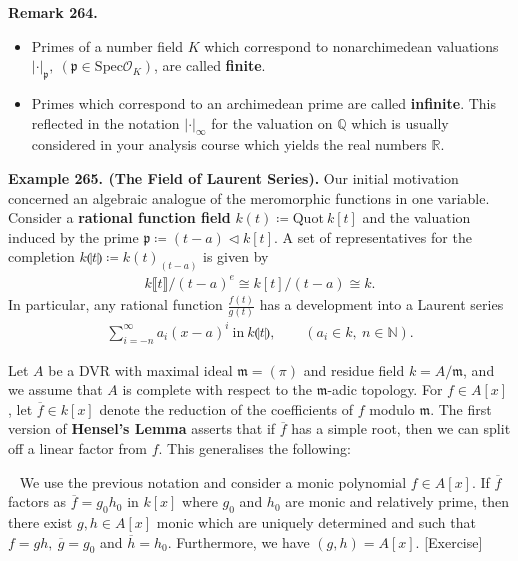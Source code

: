 \documentclass[12pt,a4paper,footinclude=true,headinclude=true]{scrbook} %
\newenvironment{theorem}[2][]
{\renewcommand\theinnercustomthm{#2}\innercustomthm[#1]
\begin{mdframed}[backgroundcolor=yellow!20]\ }
{\end{mdframed}\endinnercustomthm}
\newenvironment{remark}[2][Remark]
    { \begin{mdframed}[backgroundcolor=gray!20] \textbf{#1 #2.} }
    {  \end{mdframed}}
\newenvironment{example}[2][Example]
    { \begin{mdframed}[backgroundcolor=gray!20] \textbf{#1 #2.} }
    {  \end{mdframed}}
\begin{document}
\begin{remark}{264}
    \begin{itemize}
        \item Primes of a number field $K$ which correspond to nonarchimedean valuations $|\cdot|_\mathfrak{p},\ (\mathfrak{p}\in\mathrm{Spec}\mathcal{O}_K)$, are called \textbf{finite}. 
        \item Primes which correspond to an archimedean prime are called \textbf{infinite}. This reflected in the notation $|\cdot|_\infty$ for the valuation on $\mathbb{Q}$ which is usually considered in your analysis course which yields the real numbers $\mathbb{R}$.
    \end{itemize}
\end{remark}

\begin{example}{265. (The Field of Laurent Series)}
    \newline Our initial motivation concerned an algebraic analogue of the meromorphic functions in one variable. \\
    Consider a \textbf{rational function field} $k(t)\coloneqq\mathrm{Quot}\ k[t]$ and the valuation induced by the prime $\mathfrak{p}\coloneqq(t-a)\triangleleft k[t]$. A set of representatives for the completion $k\llparenthesis t\rrparenthesis\coloneqq k(t)_{(t-a)}$ is given by
    \begin{align*}
        k\llbracket t\rrbracket/(t-a)^e\cong k[t]/(t-a)\cong k.
    \end{align*}
    In particular, any rational function $\frac{f(t)}{g(t)}$ has a development into a Laurent series
    \begin{align*}
        \sum_{i=-n}^\infty a_i(x-a)^i\ \text{in}\ k\llparenthesis t\rrparenthesis,\qquad (a_i\in k,\ n\in\mathbb{N}).
    \end{align*}
\end{example}

Let $A$ be a DVR with maximal ideal $\mathfrak{m}=(\pi)$ and residue field $k=A/\mathfrak{m}$, and we assume that $A$ is complete with respect to the $\mathfrak{m}$-adic topology. For $f\in A[x]$, let $\overline{f}\in k[x]$ denote the reduction of the coefficients of $f$ modulo $\mathfrak{m}$. The first version of \textbf{Hensel's Lemma} asserts that if $\overline{f}$ has a simple root, then we can split off a linear factor from $f$. This generalises the following:
\begin{theorem}{266. (Hensel's Lemma Ver. II)}
    \newline We use the previous notation and consider a monic polynomial $f\in A[x]$. If $\overline{f}$ factors as $\overline{f}=g_0h_0$ in $k[x]$ where $g_0$ and $h_0$ are monic and relatively prime, then there exist $g,h\in A[x]$ monic which are uniquely determined and such that $f=gh,\ \overline{g}=g_0$ and $\overline{h}=h_0$. Furthermore, we have $(g,h)=A[x]$. [Exercise]
\end{theorem}
\end{document}

